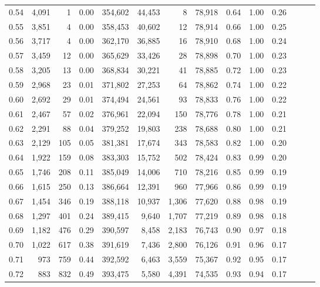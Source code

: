 \begin{tabular}{rrrrrrrrrrrrrr}
0.54 &  4,091 &      1 &  0.00 &  354,602 &   44,453 &       8 &  78,918 &  0.64 &  1.00 &      0.26 \\
0.55 &  3,851 &      4 &  0.00 &  358,453 &   40,602 &      12 &  78,914 &  0.66 &  1.00 &      0.25 \\
0.56 &  3,717 &      4 &  0.00 &  362,170 &   36,885 &      16 &  78,910 &  0.68 &  1.00 &      0.24 \\
0.57 &  3,459 &     12 &  0.00 &  365,629 &   33,426 &      28 &  78,898 &  0.70 &  1.00 &      0.23 \\
0.58 &  3,205 &     13 &  0.00 &  368,834 &   30,221 &      41 &  78,885 &  0.72 &  1.00 &      0.23 \\
0.59 &  2,968 &     23 &  0.01 &  371,802 &   27,253 &      64 &  78,862 &  0.74 &  1.00 &      0.22 \\
0.60 &  2,692 &     29 &  0.01 &  374,494 &   24,561 &      93 &  78,833 &  0.76 &  1.00 &      0.22 \\
0.61 &  2,467 &     57 &  0.02 &  376,961 &   22,094 &     150 &  78,776 &  0.78 &  1.00 &      0.21 \\
0.62 &  2,291 &     88 &  0.04 &  379,252 &   19,803 &     238 &  78,688 &  0.80 &  1.00 &      0.21 \\
0.63 &  2,129 &    105 &  0.05 &  381,381 &   17,674 &     343 &  78,583 &  0.82 &  1.00 &      0.20 \\
0.64 &  1,922 &    159 &  0.08 &  383,303 &   15,752 &     502 &  78,424 &  0.83 &  0.99 &      0.20 \\
0.65 &  1,746 &    208 &  0.11 &  385,049 &   14,006 &     710 &  78,216 &  0.85 &  0.99 &      0.19 \\
0.66 &  1,615 &    250 &  0.13 &  386,664 &   12,391 &     960 &  77,966 &  0.86 &  0.99 &      0.19 \\
0.67 &  1,454 &    346 &  0.19 &  388,118 &   10,937 &   1,306 &  77,620 &  0.88 &  0.98 &      0.19 \\
0.68 &  1,297 &    401 &  0.24 &  389,415 &    9,640 &   1,707 &  77,219 &  0.89 &  0.98 &      0.18 \\
0.69 &  1,182 &    476 &  0.29 &  390,597 &    8,458 &   2,183 &  76,743 &  0.90 &  0.97 &      0.18 \\
0.70 &  1,022 &    617 &  0.38 &  391,619 &    7,436 &   2,800 &  76,126 &  0.91 &  0.96 &      0.17 \\
0.71 &    973 &    759 &  0.44 &  392,592 &    6,463 &   3,559 &  75,367 &  0.92 &  0.95 &      0.17 \\
0.72 &    883 &    832 &  0.49 &  393,475 &    5,580 &   4,391 &  74,535 &  0.93 &  0.94 &      0.17 \\

\end{tabular}
